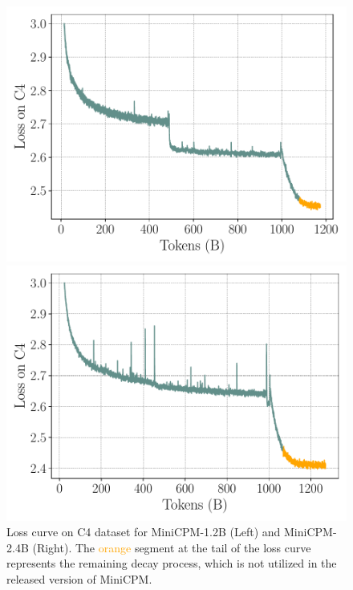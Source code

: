 \begin{figure}[htbp]
    \centering
    \begin{minipage}{0.48\linewidth}
        \centering
        \includegraphics[width=0.9\linewidth]{Fig/1.2B_c4_loss_smoothed.pdf}
    \end{minipage}
    \hfill %
    \begin{minipage}{0.48\linewidth}
        \centering
        \includegraphics[width=0.9\linewidth]{Fig/2.4B_c4_loss_smoothed.pdf}
    \end{minipage}
     \caption{Loss curve on C4 dataset for MiniCPM-1.2B (Left) and MiniCPM-2.4B (Right). The  \textcolor{orange}{orange} segment at the tail of the loss curve represents the remaining decay process, which is not utilized in the released version of MiniCPM.}
    \label{fig:loss_c4}
\end{figure}

